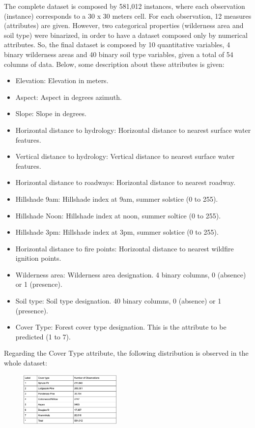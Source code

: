 \documentclass[conference]{IEEEtran}
\begin{document}
\noindent The complete dataset is composed by 581,012 instances, where each observation (instance) corresponds to a 30 x 30 meters cell. For each observation, 12 measures (attributes) are given. However, two categorical properties (wilderness area and soil type) were binarized, in order to have a dataset composed only by numerical attributes. So, the final dataset is composed by 10 quantitative variables, 4 binary wilderness areas and 40 binary soil type variables, given a total of 54 columns of data. Below, some description about these attributes is given:
\begin{itemize}
\item{Elevation: Elevation in meters.}
\item{Aspect: Aspect in degrees azimuth. }
\item{Slope: Slope in degrees.}
\item{Horizontal distance to hydrology: Horizontal distance to nearest surface water features. }
\item{Vertical distance to hydrology: Vertical distance to nearest surface water features. }
\item{Horizontal distance to roadways: Horizontal distance to nearest roadway. }
\item{Hillshade 9am: Hillshade index at 9am, summer solstice (0 to 255). }
\item{Hillshade Noon: Hillshade index at noon, summer soltice (0 to 255). }
\item{Hillshade 3pm: Hillshade index at 3pm, summer solstice (0 to 255). }
\item{Horizontal distance to fire points: Horizontal distance to nearest wildfire ignition points. }
\item{Wilderness area: Wilderness area designation. 4 binary columns, 0 (absence) or 1 (presence). }
\item{Soil type: Soil type designation. 40 binary columns, 0 (absence) or 1 (presence). }
\item{Cover Type: Forest cover type designation. This is the attribute to be predicted (1 to 7).}
\end{itemize}

Regarding the Cover Type attribute, the following distribution is observed in the whole dataset:
\begin{figure}[htbp]
\centerline{\includegraphics[width=50mm,scale=0.5]{imgs/dataset_table}}
\label{fig}
\end{figure}
\end{document}
